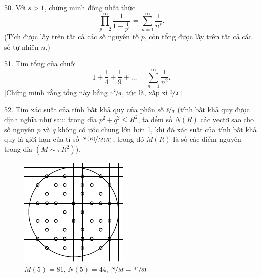 \begin{problem}{50.}
	Với $s>1$, chứng minh đồng nhất thức
	\begin{equation*}
		\textstyle\prod\limits_{p=2}^{\infty} \frac{1}{1-\frac{1}{p^s}}=\textstyle\sum\limits_{n=1}^{\infty} \frac{1}{n^s}.
	\end{equation*}
	(Tích được lấy trên tất cả các số nguyên tố $p$, còn tổng được lấy trên tất cả các số tự nhiên $n$.)
\end{problem}

\begin{problem}{51.}
	Tìm tổng của chuỗi
	\begin{equation*}
		1+ \frac{1}{4}+ \frac{1}{9}+\dots=\textstyle\sum\limits_{n=1}^{\infty} \frac{1}{n^2}.
	\end{equation*}
	[Chứng minh rằng tổng này bằng $\nicefrac{\pi^2}{6}$, tức là, xấp xỉ $\nicefrac{3}{2}$.]
\end{problem}

\begin{problem}{52.}
	Tìm xác suất của tính bất khả quy của phân số $\nicefrac{p}{q}$ (tính bất khả quy được định nghĩa như sau: trong đĩa $p^2+q^2 \leqslant R^2$, ta đếm số $N(R)$ các vectơ sao cho số nguyên $p$ và $q$ không có ước chung lớn hơn 1, khi đó xác suất của tính bất khả quy là giới hạn của tỉ số $\nicefrac{N(R)}{M(R)}$, trong đó $M(R)$ là số các điểm nguyên trong đĩa $(M\sim \pi R^2)$).
	\begin{figure}
		\includegraphics{resources/taskbook-36}\\
		\footnotesize $M(5)=81$, $N(5)=44$, $\nicefrac{N}{M} = \nicefrac{44}{81}$
	\end{figure}
\end{problem}

